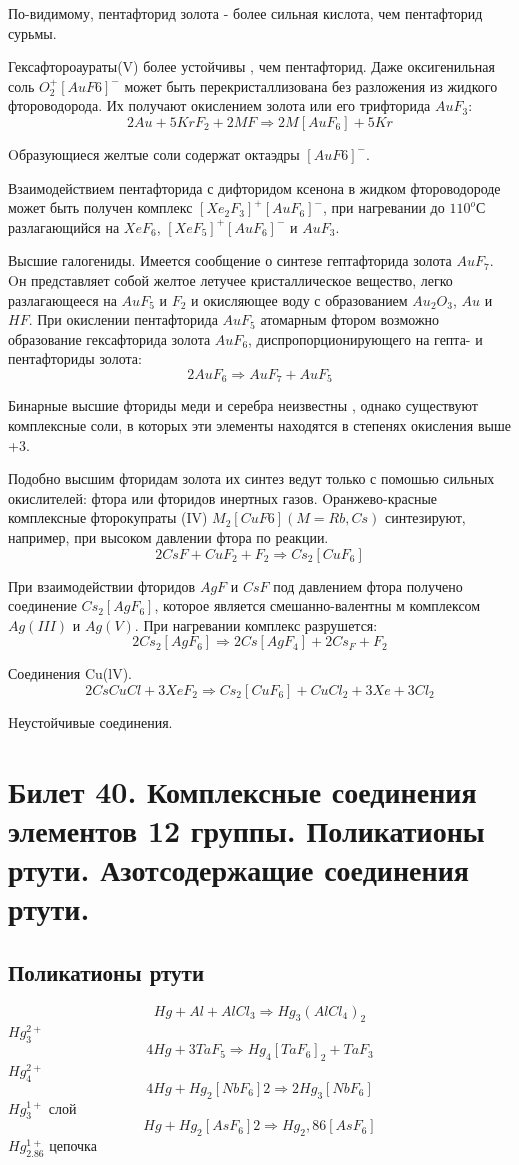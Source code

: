 \documentclass[11pt]{article}
\begin{document}
По-видимому, пентафторид золота - более сильная кислота, чем пентафторид сурьмы.

Гексафтороаураты(V) более устойчивы , чем пентафторид. Даже оксигенильная соль
$O_2^+[AuF6]^-$ может быть перекристаллизована без разложения из жидкого фтороводорода. Их получают окислением золота или его трифторида $AuF _3$:
$$2Au + 5KrF _2 + 2MF \Rightarrow 2M [AuF_6] + 5Kr$$

Oбразующиеся желтые соли содержат октаэдры $[AuF6]^-$.

Взаимодействием пентафторида с дифторидом ксенона в жидком фтороводороде может быть получен комплекс
$[Xe_2F_3]^+[AuF_6]^-$, при нагревании до $110^oС$ разлагающийся на $XeF_6$, $[XeF_5]^+[AuF_6]^-$ и $AuF_3$.

Высшие галогениды. Имеется сообщение о синтезе гептафторида золота $AuF_7$. Oн представляет собой желтое
летучее кристаллическое вещество, легко разлагающееся на $AuF_5$ и $F_2$ и окисляющее воду с образованием $Au_2O_3$, $Au$ и $HF$.
При окислении пентафторида $AuF_5$ атомарным фтором возможно образование гексафторида золота $AuF_6$,
диспропорционирующего на гепта- и пентафториды золота:
$$2AuF_6 \Rightarrow AuF_7 + AuF _5$$

Бинарные высшие фториды меди и серебра неизвестны , однако существуют комплексные соли, в которых эти
элементы находятся в степенях окисления выше +3.

Подобно высшим фторидам золота их синтез ведут только с помошью сильных окислителей: фтора или фторидов
инертных газов. Oранжево-красные комплексные фторокупраты (IV) $M_2[CuF6] (M = Rb, Cs)$ синтезируют, например, при высоком давлении фтора по реакции.
$$2CsF + CuF_2 + F_2 \Rightarrow Cs_2[CuF_6]$$

При взаимодействии фторидов $AgF$ и $CsF$ под давлением фтора получено соединение $Cs_2[AgF_6]$, которое является смешанно-валентны м комплексом $Ag(III)$ и $Ag(V)$.
При нагревании комплекс разрушется:
$$2Cs_2[AgF_6] \Rightarrow 2Cs[AgF_4] + 2Cs_F + F_2$$

Соединения Cu(lV).
$$2CsCuCl+3XeF_2\Rightarrow Cs_2[CuF_6]+CuCl_2+3Xe+3Cl_2$$

Hеустойчивые соединения.


\section{Билет 40. Комплексные соединения элементов 12 группы. Поликатионы ртути.
Азотсодержащие соединения ртути.}

\subsection{Поликатионы ртути}
$$Hg + Al + AlCl _3 \Rightarrow Hg _3 (AlCl _4 ) _2 $$ $Hg _3 ^{2+}$
$$4Hg + 3TaF _5 \Rightarrow Hg _4 [TaF _6 ] _2 + TaF _3 $$ $Hg _4 ^{2+}$
$$4Hg + Hg _2 [NbF _6 ] 2 \Rightarrow 2Hg _3 [NbF _6 ]  $$ $Hg _3 ^{1+}$ слой
$$Hg + Hg _2 [AsF _6 ] 2 \Rightarrow Hg _2,86 [AsF _6 ] $$ $Hg _{2.86} ^{1+}$ цепочка
\end{document}
